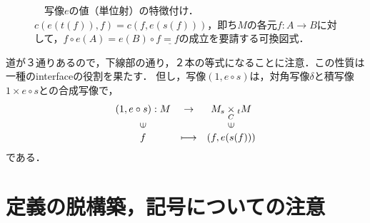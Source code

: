 \documentclass[uplatex, 12pt, dvipdfmx]{jsreport}
\begin{document}
\begin{figure}[ht] \begin{center}  \caption{\label{def-cd:4}　写像$e$の値（単位射）の特徴付け．$c(e(t(f)),f)=c(f,e(s(f)))$，即ち$M$の各元$f:A\rightarrow B$に対して，$f\circ e(A)=e(B)\circ f\underline{=f}$の成立を要請する可換図式．}
\end{center}\end{figure}
道が３通りあるので，下線部の通り，２本の等式になることに注意．この性質は一種のinterfaceの役割を果たす．
但し，写像$(1,e\circ s)$は，対角写像$\delta$と積写像$1\times e\circ s$との合成写像で，
$$\begin{array}{ccc}
    (1,e\circ s):M & \rightarrow & M_s \underset{C}{\times}{}_tM\\
    \rotatebox{90}{$\in$} & & \rotatebox{90}{$\in$}\\
    f & \longmapsto & (f,e(s(f)))
\end{array}$$
である．

\section{定義の脱構築，記号についての注意}
\end{document}
